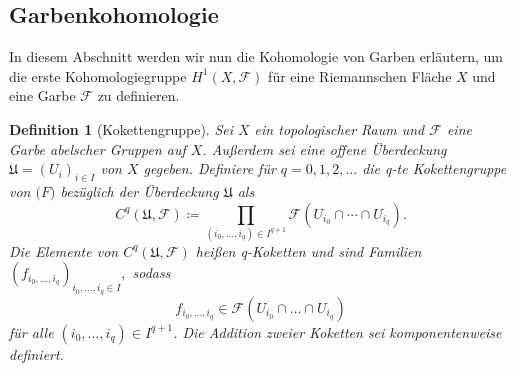 \documentclass[11pt,a4paper]{scrartcl}
\theoremstyle{thm}
\theoremstyle{def}
\newtheorem{defi}{Definition}[section]
\theoremstyle{remark}
\begin{document}
\subsection{Garbenkohomologie}
In diesem Abschnitt werden wir nun die Kohomologie von Garben erläutern, um die erste Kohomologiegruppe $H^1(X,\mathcal{F})$ für eine Riemannschen Fläche $X$ und eine Garbe $\mathcal{F}$ zu definieren.
\begin{defi}[Kokettengruppe]
Sei $X$ ein topologischer Raum und $\mathcal{F}$ eine Garbe abelscher Gruppen auf $X$. Außerdem sei eine offene Überdeckung $\mathfrak{U}= (U_i)_{i\in I}$ von $X$ gegeben.
Definiere für $q =0,1,2,...$ die \emph{q-te Kokettengruppe} von $\mathcal(F)$ bezüglich der Überdeckung $\mathfrak{U}$ als 
\[
C^q(\mathfrak{U},\mathcal{F}) \coloneqq \prod_{(i_0,...,i_q)\in I^{q+1}} \mathcal{F}(U_{i_0}\cap \cdots\cap U_{i_q}). 
\]
Die Elemente von $C^q(\mathfrak{U},\mathcal{F})$ heißen \emph{q-Koketten} und sind Familien
$
(f_{i_0,...,i_q})_{i_0,...,i_q\in I}, 
$
sodass
\[
 f_{i_0,...,i_q}\in\mathcal{F}(U_{i_0}\cap \ldots \cap U_{i_q})
\]
für alle $(i_0,\ldots,i_q)\in I^{q+1}$.
Die Addition zweier Koketten sei komponentenweise definiert.
\end{defi}
\end{document}
